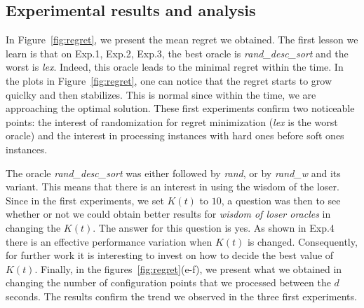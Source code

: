 \documentclass[10pt, conference, compsocconf]{IEEEtran}
\begin{document}
\subsection{Experimental results and analysis}

In Figure~\ref{fig:regret}, we present the mean regret we obtained. The first lesson we learn is that
on {\small Exp.1, Exp.2, Exp.3}, the best oracle is {\it rand\_desc\_sort}  and the worst is {\it lex}.
Indeed, this oracle leads to the minimal regret within the time. In the plots in Figure~\ref{fig:regret},
one can notice that the regret starts to grow quiclky and then stabilizes. This is normal since within
the time, we are approaching the optimal solution.
These first experiments confirm two noticeable points: the interest of randomization
for regret minimization ({\it lex} is the worst oracle) and the interest in processing instances with hard ones
before soft ones instances.

The oracle {\it rand\_desc\_sort} was either followed by {\it rand}, or by {\it rand\_w} and its variant.
This means that there is an interest in using the wisdom of the loser. Since in the first experiments,
we set $K(t)$ to $10$, a question was then to see whether or not we could obtain better
results for {\it wisdom of loser oracles} in changing the $K(t)$.  The answer for this question is yes.
As shown in {\small Exp.4} there is an effective
performance variation when $K(t)$ is changed. Consequently, for further work it is interesting to invest on how to
decide the best value of $K(t)$. Finally, in the figures~\ref{fig:regret}(e-f), we present what we obtained in changing
the number of configuration points that we processed between the $d$ seconds. The results confirm the trend we observed
in the three first experiments.
\end{document}
